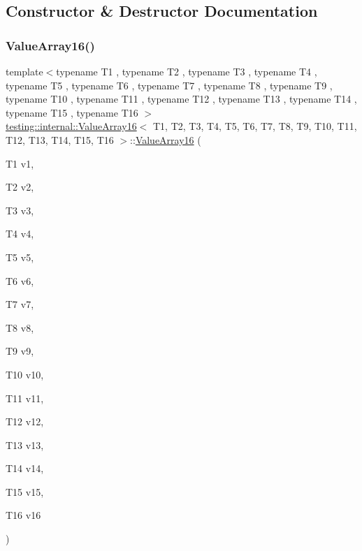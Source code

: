 \subsection{Constructor \& Destructor Documentation}
\mbox{\label{classtesting_1_1internal_1_1_value_array16_ac12b3a15ab5418665a97b4a225438529}} 
\subsubsection{\texorpdfstring{ValueArray16()}{ValueArray16()}\hspace{0.1cm}{\footnotesize\ttfamily [1/2]}}
{\footnotesize\ttfamily template$<$typename T1 , typename T2 , typename T3 , typename T4 , typename T5 , typename T6 , typename T7 , typename T8 , typename T9 , typename T10 , typename T11 , typename T12 , typename T13 , typename T14 , typename T15 , typename T16 $>$ \\
\mbox{\hyperlink{classtesting_1_1internal_1_1_value_array16}{testing\+::internal\+::\+Value\+Array16}}$<$ T1, T2, T3, T4, T5, T6, T7, T8, T9, T10, T11, T12, T13, T14, T15, T16 $>$\+::\mbox{\hyperlink{classtesting_1_1internal_1_1_value_array16}{Value\+Array16}} (\begin{DoxyParamCaption}\item[{T1}]{v1,  }\item[{T2}]{v2,  }\item[{T3}]{v3,  }\item[{T4}]{v4,  }\item[{T5}]{v5,  }\item[{T6}]{v6,  }\item[{T7}]{v7,  }\item[{T8}]{v8,  }\item[{T9}]{v9,  }\item[{T10}]{v10,  }\item[{T11}]{v11,  }\item[{T12}]{v12,  }\item[{T13}]{v13,  }\item[{T14}]{v14,  }\item[{T15}]{v15,  }\item[{T16}]{v16 }\end{DoxyParamCaption})\hspace{0.3cm}{\ttfamily [inline]}}

